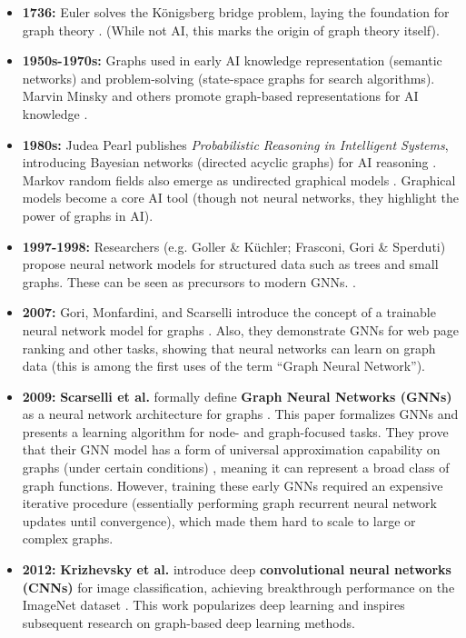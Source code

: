 \documentclass{article}
\begin{document}
\begin{itemize}
      \item \textbf{1736:} Euler solves the Königsberg bridge problem, laying the foundation for graph theory \cite{carlson2019konigsberg}. (While not AI, this marks the origin of graph theory itself).
      \item \textbf{1950s-1970s:} Graphs used in early AI knowledge representation (semantic networks) and problem-solving (state-space graphs for search algorithms). Marvin Minsky and others promote graph-based representations for AI knowledge \cite{kelemen2007neural}.
      \item \textbf{1980s:} Judea Pearl publishes \textit{Probabilistic Reasoning in Intelligent Systems}, introducing Bayesian networks (directed acyclic graphs) for AI reasoning \cite{pearl1995bayesian}. Markov random fields also emerge as undirected graphical models \cite{lang2024abstract}. Graphical models become a core AI tool (though not neural networks, they highlight the power of graphs in AI).
      \item \textbf{1997-1998:} Researchers (e.g. Goller \& Küchler; Frasconi, Gori \& Sperduti) propose neural network models for structured data such as trees and small graphs. These can be seen as precursors to modern GNNs. \cite{frasconi1998general}.
      \item \textbf{2007:} Gori, Monfardini, and Scarselli introduce the concept of a trainable neural network model for graphs \cite{gori2007new}. Also, they demonstrate GNNs for web page ranking and other tasks, showing that neural networks can learn on graph data (this is among the first uses of the term “Graph Neural Network”).
      \item \textbf{2009:} \textbf{Scarselli et al.} formally define \textbf{Graph Neural Networks (GNNs)} as a neural network architecture for graphs \cite{scarselli2009graph}. This paper formalizes GNNs and presents a learning algorithm for node- and graph-focused tasks. They prove that their GNN model has a form of universal approximation capability on graphs (under certain conditions) \cite{scarselli2009computational}, meaning it can represent a broad class of graph functions. However, training these early GNNs required an expensive iterative procedure (essentially performing graph recurrent neural network updates until convergence), which made them hard to scale to large or complex graphs.
      \item \textbf{2012:} \textbf{Krizhevsky et al.} introduce deep \textbf{convolutional neural networks (CNNs)} for image classification, achieving breakthrough performance on the ImageNet dataset \cite{krizhevsky2012imagenet}. This work popularizes deep learning and inspires subsequent research on graph-based deep learning methods.

\end{itemize}
\end{document}
